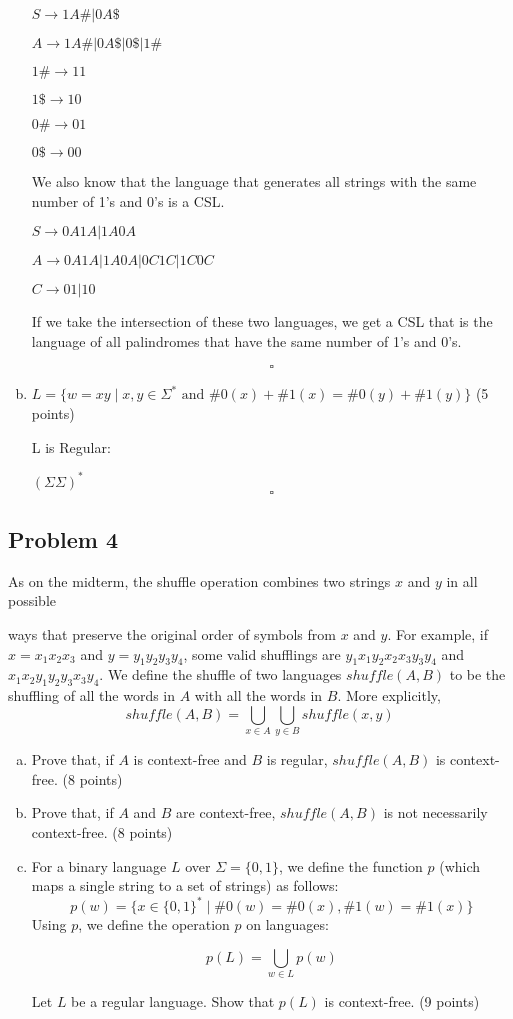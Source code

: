 \documentclass{article}
\begin{document}
\begin{enumerate}[(a)]
$S \rightarrow 1A\# | 0A\$$

$A \rightarrow 1A\# | 0A\$ | 0\$ | 1\#$

$1\# \rightarrow 11$

$1\$ \rightarrow 10$

$0\# \rightarrow 01$

$0\$ \rightarrow 00$

We also know that the language that generates all strings with the same number
of 1's and 0's is a CSL.

$S \rightarrow 0A1A | 1A0A$

$A \rightarrow 0A1A | 1A0A | 0C1C | 1C0C$

$C \rightarrow 01 | 10$

If we take the intersection of these two languages, we get a CSL that is
the language of all palindromes that have the same number of 1's and 0's.

\[ \square \]

            \item $L = \{w=xy \;|\; x,y\in\Sigma^* \text{ and } \#0(x)+\#1(x)=\#0(y)+\#1(y)\}$ (5 points)

            L is Regular:

            $(\Sigma\Sigma)^*$
            \[ \square \]

            \end{enumerate}
            \newpage
            \subsection*{Problem 4}
            As on the midterm, the shuffle operation combines two strings $x$ and $y$ in all possible
            
            ways that preserve the original order of symbols from $x$ and $y$.  For example, if
            $x=x_1x_2x_3$ and $y=y_1y_2y_3y_4$, some valid shufflings are $y_1x_1y_2x_2x_3y_3y_4$ and
            $x_1x_2y_1y_2y_3x_3y_4$.  We define the shuffle of two languages $shuffle(A,B)$ to be the
            shuffling of all the words in $A$ with all the words in $B$.  More explicitly,
            \[shuffle(A,B)=\bigcup\limits_{x \in A}\bigcup\limits_{y \in B} shuffle(x,y)\]
            \begin{enumerate}[(a)]
    \item Prove that, if $A$ is context-free and $B$ is regular, $shuffle(A,B)$ is
context-free. (8 points)
    \item Prove that, if $A$ and $B$ are context-free, $shuffle(A,B)$ is not necessarily
context-free. (8 points)
    \item For a binary language $L$ over $\Sigma=\{0,1\}$, we define the function $p$ (which
            maps a single string to a set of strings) as follows:
    \[p(w) = \{ x \in \{0,1\}^* \;|\; \#0(w) = \#0(x), \#1(w) = \#1(x) \}\]
    Using $p$, we define the operation $p$ on languages:

    \[p(L) = \bigcup\limits_{w \in L} p(w)\]

Let $L$ be a regular language.  Show that $p(L)$ is context-free. (9 points)
    \end{enumerate}
    \newpage
\end{document}

